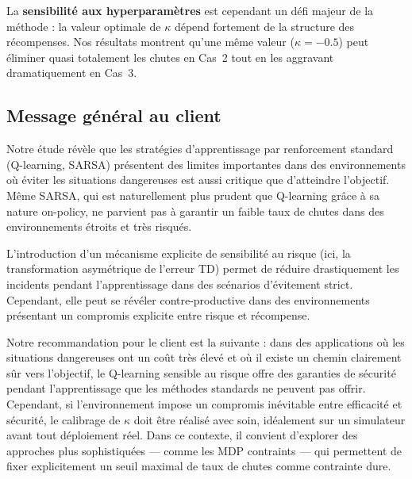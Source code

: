 \documentclass{article}
\begin{document}
La \textbf{sensibilité aux hyperparamètres} est cependant un défi majeur de la méthode : la valeur optimale de $\kappa$ dépend fortement de la structure des récompenses. Nos résultats montrent qu'une même valeur ($\kappa = -0.5$) peut éliminer quasi totalement les chutes en Cas~2 tout en les aggravant dramatiquement en Cas~3.

\subsection{Message général au client}

Notre étude révèle que les stratégies d'apprentissage par renforcement standard (Q-learning, SARSA) présentent des limites importantes dans des environnements où éviter les situations dangereuses est aussi critique que d'atteindre l'objectif. Même SARSA, qui est naturellement plus prudent que Q-learning grâce à sa nature on-policy, ne parvient pas à garantir un faible taux de chutes dans des environnements étroits et très risqués.

L'introduction d'un mécanisme explicite de sensibilité au risque (ici, la transformation asymétrique de l'erreur TD) permet de réduire drastiquement les incidents pendant l'apprentissage dans des scénarios d'évitement strict. Cependant, elle peut se révéler contre-productive dans des environnements présentant un compromis explicite entre risque et récompense.

Notre recommandation pour le client est la suivante : dans des applications où les situations dangereuses ont un coût très élevé et où il existe un chemin clairement sûr vers l'objectif, le Q-learning sensible au risque offre des garanties de sécurité pendant l'apprentissage que les méthodes standards ne peuvent pas offrir. Cependant, si l'environnement impose un compromis inévitable entre efficacité et sécurité, le calibrage de $\kappa$ doit être réalisé avec soin, idéalement sur un simulateur avant tout déploiement réel. Dans ce contexte, il convient d'explorer des approches plus sophistiquées — comme les MDP contraints — qui permettent de fixer explicitement un seuil maximal de taux de chutes comme contrainte dure.
\end{document}
